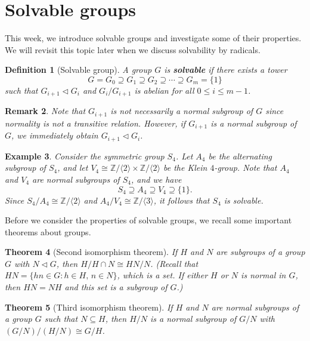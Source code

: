\documentclass[10pt]{article}
\newcommand{\Z}{\mathbb{Z}}
\newcommand{\norm}{\triangleleft}
\theoremstyle{newstyle}
\newtheorem{thm}{Theorem}[section]
\newtheorem{remark}[thm]{Remark}
\newtheorem{defn}[thm]{Definition}
\newtheorem{exmp}[thm]{Example}
\begin{document}
\newpage 
\section{Solvable groups}
This week, we introduce solvable groups and investigate some of their properties.
We will revisit this topic later when we discuss solvability by radicals. 

\begin{defn}[Solvable group]
A group $G$ is {\bf solvable} if there exists a tower 
\[ G = G_0 \supseteq G_1 \supseteq G_2 \supseteq \cdots \supseteq G_m = \{1\} \]
such that $G_{i+1} \triangleleft G_i$ and $G_i/G_{i+1}$ is abelian for all $0 \leq i \leq m-1$. 
\end{defn}

\begin{remark}
Note that $G_{i+1}$ is not necessarily a normal subgroup of $G$ since normality is 
not a transitive relation. However, if $G_{i+1}$ is a normal subgroup of $G$, we immediately 
obtain $G_{i+1} \triangleleft G_i$. 
\end{remark}

\begin{exmp}
Consider the symmetric group $S_4$. Let $A_4$ be the alternating subgroup of $S_4$, and 
let $V_4 \cong \Z/\langle 2 \rangle \times \Z/\langle 2 \rangle$ be the Klein $4$-group. 
Note that $A_4$ and $V_4$ are normal subgroups of $S_4$, and we have 
\[ S_4 \supseteq A_4 \supseteq V_4 \supseteq \{1\}. \]
Since $S_4/A_4 \cong \Z/\langle 2 \rangle$ and $A_4/V_4 \cong \Z/\langle 3 \rangle$, it follows that 
$S_4$ is solvable. 
\end{exmp}

Before we consider the properties of solvable groups, we recall some important theorems about groups. 

\begin{thm}[Second isomorphism theorem]
If $H$ and $N$ are subgroups of a group $G$ with $N \norm G$, then $H/H \cap N \cong HN/N$. 
(Recall that $HN = \{hn \in G : h \in H,\, n \in N\}$, which is a set. If either $H$ or $N$ is 
normal in $G$, then $HN = NH$ and this set is a subgroup of $G$.)
\end{thm}

\begin{thm}[Third isomorphism theorem]
If $H$ and $N$ are normal subgroups of a group $G$ such that $N \subseteq H$, then $H/N$ is a 
normal subgroup of $G/N$ with $(G/N)/(H/N) \cong G/H$. 
\end{thm}
\end{document}
